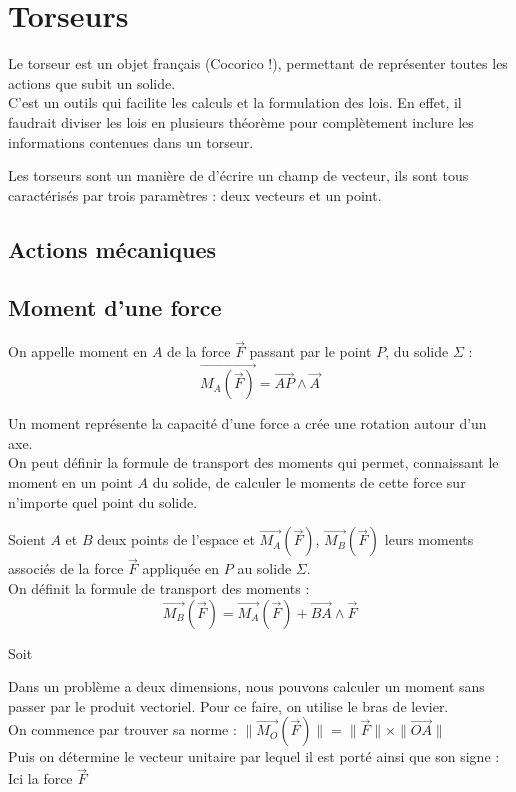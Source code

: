 \chapter{Torseurs}
Le torseur est un objet français (Cocorico !), permettant de représenter toutes les actions que subit un solide.\\
C'est un outils qui facilite les calculs et la formulation des lois.
En effet, il faudrait diviser les lois en plusieurs théorème pour complètement inclure les informations contenues dans un torseur.

Les torseurs sont un manière de d'écrire un champ de vecteur, ils sont tous caractérisés par trois paramètres : deux vecteurs et un point.
\section{Actions mécaniques}
\section{Moment d'une force}
\begin{defi}
On appelle moment en $A$ de la force $\overrightarrow{F}$ passant par le point $P$, du solide $\Sigma$ :
$$\overrightarrow{M_{A}(\overrightarrow{F})}=\overrightarrow{AP}\land\overrightarrow{A}$$
\end{defi}
Un moment représente la capacité d'une force a crée une rotation autour d'un axe.\\
On peut définir la formule de transport des moments qui permet, connaissant le moment en un point $A$ du solide, de calculer le moments de cette force sur n'importe quel point du solide.
\begin{prop}
Soient $A$ et $B$ deux points de l'espace et $\overrightarrow{M_{A}}(\overrightarrow{F})$, $\overrightarrow{M_{B}}(\overrightarrow{F})$ leurs moments associés de la force $\overrightarrow{F}$ appliquée en $P$ au solide $\Sigma$.\\
On définit la formule de transport des moments :
$$\overrightarrow{M_{B}}(\overrightarrow{F})=\overrightarrow{M_{A}}(\overrightarrow{F})+\overrightarrow{BA}\land\overrightarrow{F}$$
\end{prop}
\begin{demo}
Soit
\end{demo}
\begin{meth}
Dans un problème a deux dimensions, nous pouvons calculer un moment sans passer par le produit vectoriel. Pour ce faire, on utilise le bras de levier.\\
On commence par trouver sa norme : $\|\overrightarrow{M_O}(\overrightarrow{F})\|=\|\overrightarrow{F}\|\times\|\overrightarrow{OA}\|$\\
Puis on détermine le vecteur unitaire par lequel il est porté ainsi que son signe :\\
Ici la force $\overrightarrow{F}$
\end{meth}

